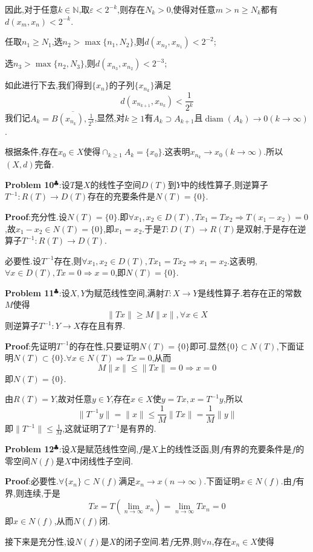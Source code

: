 因此,对于任意$k\in \mathbb{N}$,取$\varepsilon<2^{-k}$,则存在$N_k>0$,使得对任意$m>n\geqslant N_k$都有$d(x_m,x_n)<2^{-k}$.\par
任取$n_1\geqslant N_1$,选$n_2>\max\{n_1,N_2\}$,则$d(x_{n_2},x_{n_1})<2^{-2}$;\par
选$n_3>\max\{n_2,N_3\}$,则$d(x_{n_3},x_{n_2})<2^{-3}$;\par
如此进行下去,我们得到$\{x_n\}$的子列$\{x_{n_k}\}$满足
$$
d(x_{n_{k+1}},x_{n_{k}})<\frac{1}{2^k}
$$
我们记$A_k=\overline{B(x_{n_k}),\frac{1}{2^k}}$,显然,对$k\geqslant 1$有$A_k\supset A_{k+1}$且$\operatorname{diam}(A_k)\to 0(k\to\infty)$.\par
根据条件,存在$x_0\in X$使得$\cap_{k\geqslant 1}A_k=\{x_0\}$.这表明$x_{n_k}\to x_0(k\to\infty)$.所以$(X,d)$完备.\par
\textbf{Problem 10}$^\clubsuit $:设$T$是$X$的线性子空间$D(T)$到$Y$中的线性算子,则逆算子$T^{-1}:R(T)\to D(T)$存在的充要条件是$N(T)=\{0\}$.\par
\textbf{Proof}:充分性.设$N(T)=\{0\}$.即$\forall x_1,x_2\in D(T),Tx_1=Tx_2\Rightarrow T(x_1-x_2)=0$,故$x_1-x_2\in N(T)=\{0\}$,即$x_1=x_2$.于是$T:D(T)\to R(T)$是双射,于是存在逆算子$T^{-1}:R(T)\to D(T)$.\par
必要性.设$T^{-1}$存在,则$\forall x_1,x_2\in D(T),Tx_1=Tx_2\Rightarrow x_1=x_2$.这表明,$\forall x\in D(T),Tx=0\Rightarrow x=0$,即$N(T)=\{0\}$.\par
\textbf{Problem 11}$^\clubsuit $:设$X,Y$为赋范线性空间,满射$T:X\to Y$是线性算子.若存在正的常数$M$使得
$$
\|Tx\|\geqslant M\|x\|,\forall x\in X
$$
则逆算子$T^{-1}:Y\to X$存在且有界.\par
\textbf{Proof}:先证明$T^{-1}$的存在性,只要证明$N(T)=\{0\}$即可.显然$\{0\}\subset N(T)$,下面证明$N(T)\subset\{0\}$.$\forall x\in N(T)\Rightarrow Tx=0$,从而
$$
M\|x\|\leqslant \|Tx\|=0\Rightarrow x=0
$$
即$N(T)=\{0\}$.\par
由$R(T)=Y$,故对任意$y\in Y$,存在$x\in X$使$y=Tx,x=T^{-1}y$,所以
$$
\|T^{-1}y\|=\|x\|\leqslant \frac{1}{M}\|Tx\|=\frac{1}{M}\|y\|
$$
即$\|T^{-1}\|\leqslant \frac{1}{M}$,这就证明了$T^{-1}$是有界的.\par
\textbf{Problem 12}$^\clubsuit $:设$X$是赋范线性空间,$f$是$X$上的线性泛函,则$f$有界的充要条件是$f$的零空间$N(f)$是$X$中闭线性子空间.\par
\textbf{Proof}:必要性.$\forall\{x_n\}\subset N(f)$满足$x_n\to x(n\to\infty)$.下面证明$x\in N(f)$.由$f$有界,则连续,于是
$$
Tx=T(\lim_{n\to\infty}x_n)=\lim_{n\to\infty}Tx_n=0
$$
即$x\in N(f)$,从而$N(f)$闭.\par
接下来是充分性,设$N(f)$是$X$的闭子空间.若$f$无界,则$\forall n$,存在$x_n\in X$使得
